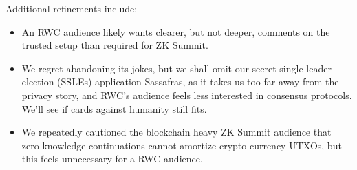 \documentclass{article}
\begin{document}
\noindent Additional refinements include:
\begin{itemize}
\item An RWC audience likely wants clearer, but not deeper, comments
 on the trusted setup than required for ZK Summit.
\item We regret abandoning its jokes, but we shall omit our secret single
 leader election (SSLEs) application Sassafras, as it takes us too far
 away from the privacy story, and RWC's audience feels less interested in
 consensus protocols.  We'll see if cards against humanity still fits.
\item We repeatedly cautioned the blockchain heavy ZK Summit audience
 that zero-knowledge continuations cannot amortize crypto-currency
 UTXOs, but this feels unnecessary for a RWC audience.
\end{itemize}



\end{document}
